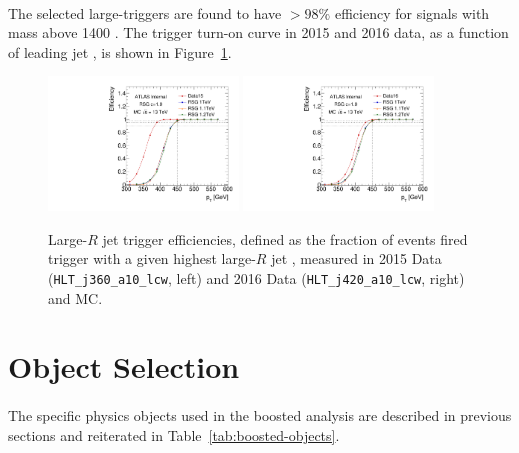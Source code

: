 \paragraph{}
The selected large-\R triggers are found to have $>98\%$ efficiency for signals with mass above 1400 \GeV.
The trigger turn-on curve in 2015 and 2016 data, as a function of leading jet \pt, is shown in Figure~\ref{fig:boosted-trigger-HLT-turnon}.
\begin{figure}[htbp!]
\begin{center}
  \includegraphics[width=0.45\textwidth,angle=-90]{figures/boosted/Trigger/trig_15_b77_pT_Efficiency.pdf}
  \includegraphics[width=0.45\textwidth,angle=-90]{figures/boosted/Trigger/trig_16_b77_pT_Efficiency.pdf}
  \caption{Large-$R$ jet trigger efficiencies, defined as the fraction of events fired trigger with a given highest large-$R$ jet \pt, measured in 2015 Data (\texttt{HLT\_j360\_a10\_lcw}, left) and 2016 Data (\texttt{HLT\_j420\_a10\_lcw}, right) and MC.}
  \label{fig:boosted-trigger-HLT-turnon}
\end{center}
\end{figure}


\section{Object Selection}
\paragraph{}
The specific physics objects used in the boosted analysis are described in previous sections and reiterated in Table~\ref{tab:boosted-objects}.

